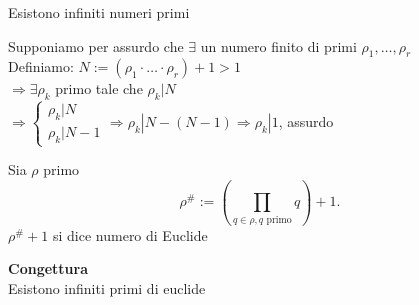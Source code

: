 \documentclass[12px]{article}
\begin{document}
	\begin{teo}[Euclide]
		Esistono infiniti numeri primi
	\end{teo}
	\begin{dimo}
		Supponiamo per assurdo che $\exists$ un numero finito di primi $\rho_1,\ldots, \rho_r$\\
		Definiamo:
		$N:= (\rho_1 \cdot\ldots\cdot\rho_r) + 1 > 1$\\
		$ \Rightarrow\exists \rho_k$ primo tale che $\rho_k | N$\\
		 $ \Rightarrow \begin{cases}
		 	\rho_k|N\\
			\rho_k|N-1
		 \end{cases} \Rightarrow \rho_k|N-(N-1) \Rightarrow \rho_k | 1$, assurdo
	\end{dimo}
	\begin{defi}
		Sia $\rho$ primo
		\[
			\rho^\# := \left(\prod_{q\in\rho, q \text{ primo}} q \right) + 1
		.\] 
		$\rho^\#+1$ si dice numero di Euclide
	\end{defi}
	\textbf{Congettura}\\
	Esistono infiniti primi di euclide
\end{document}
